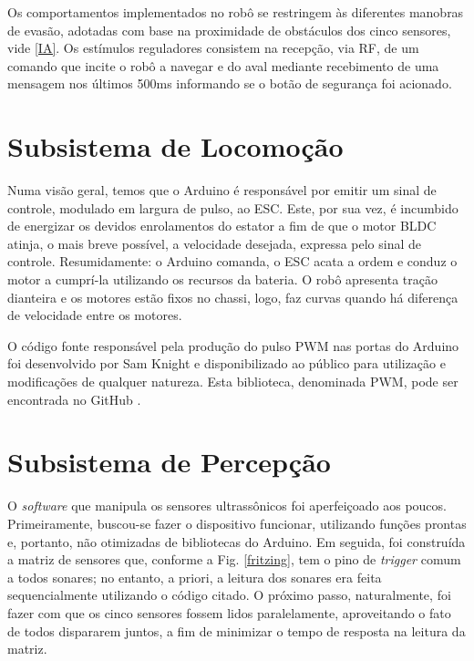 Os comportamentos implementados no robô se restringem às diferentes manobras de evasão, adotadas com base na proximidade de obstáculos dos cinco 
sensores, vide \ref{IA}. Os estímulos reguladores consistem na recepção, via RF, de um comando que incite o robô a navegar e do aval mediante 
recebimento de uma mensagem nos últimos 500ms informando se o botão de segurança foi acionado.

\section{Subsistema de Locomoção}
Numa visão geral, temos que o Arduino é responsável por emitir um sinal de controle, modulado em largura de pulso, ao ESC.
Este, por sua vez, é incumbido de energizar os devidos enrolamentos do estator a fim de que o motor BLDC atinja, o mais breve possível, a velocidade 
desejada, expressa pelo sinal de controle. 
Resumidamente: o Arduino comanda, o ESC acata a ordem e conduz o motor a cumprí-la utilizando os recursos da bateria.
O robô apresenta tração dianteira e os motores estão fixos no chassi, logo, faz curvas quando há diferença de velocidade entre os motores.

O código fonte responsável pela produção do pulso PWM nas portas do Arduino foi desenvolvido por Sam Knight e disponibilizado ao público para 
utilização e modificações de qualquer natureza.
Esta biblioteca, denominada PWM, pode ser encontrada no GitHub \cite{pwm_lib}.


\section{Subsistema de Percepção}
O \textit{software} que manipula os sensores ultrassônicos foi aperfeiçoado aos poucos.
Primeiramente, buscou-se fazer o dispositivo funcionar, utilizando funções prontas e, portanto, não otimizadas de bibliotecas do Arduino.
Em seguida, foi construída a matriz de sensores que, conforme a Fig. \ref{fritzing}, tem o pino de \textit{trigger} comum a todos sonares; no 
entanto, a priori, a leitura dos sonares era feita sequencialmente utilizando o código citado.
O próximo passo, naturalmente, foi fazer com que os cinco sensores fossem lidos paralelamente, aproveitando o fato de todos dispararem juntos, a fim 
de minimizar o tempo de resposta na leitura da matriz.

